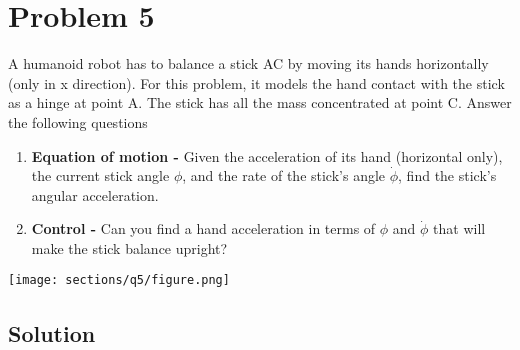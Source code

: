 \section*{Problem 5}

A humanoid robot has to balance a stick AC by moving its hands horizontally (only in x direction).
For this problem, it models the hand contact with the stick as a hinge at point A.
The stick has all the mass concentrated at point C.
Answer the following questions

\begin{enumerate}[label = (\alph*)]
    \item \textbf{Equation of motion -} Given the acceleration of its hand (horizontal only), the current stick angle \( \phi \), and the rate of the stick's angle \( \dot\phi \), find the stick's angular acceleration.
    \item \textbf{Control -} Can you find a hand acceleration in terms of \( \phi \) and \( \dot\phi \) that will make the stick balance upright?
\end{enumerate}

\begin{figure*}[h]
    \centering
    \texttt{[image: sections/q5/figure.png]}
\end{figure*}

\subsection*{Solution}
